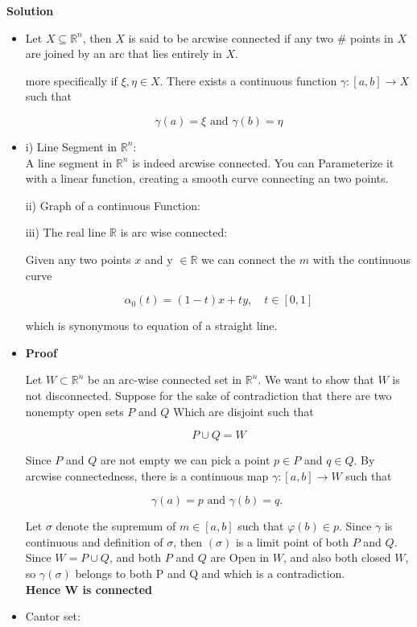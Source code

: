 \documentclass{article}
\begin{document}
\textbf{Solution}\\
\begin{itemize}
    \item Let $X \subseteq \mathbb{R}^{n}$, then $X$ is said to be arcwise connected if any two \# points in $X$ are joined by an arc that lies entirely in $X$.

more specifically if $\xi, \eta \in X$. There exists a continuous function $\gamma:[a, b] \rightarrow X$ such that

$$
\gamma(a)=\xi \text { and } \gamma(b)=\eta
$$
\item i) Line Segment in $\mathbb{R}^{n}$:\\
A line segment in $\mathbb{R}^{n}$ is indeed arcwise connected. You can Parameterize it with a linear function, creating a smooth curve connecting an two points.

ii) Graph of a continuous Function:

iii) The real line $\mathbb{R}$ is arc wise connected:

Given any two points $x$ and y $\in \mathbb{R}$ we can connect the $m$ with the continuous curve

$$
\alpha_{0}(t)=(1-t) x+t y, \quad t \in[0,1]
$$

which is synonymous to equation of a straight line.

\item \textbf{Proof}

Let $W \subset \mathbb{R}^{n}$ be an arc-wise connected set in $\mathbb{R}^{n}$. We want to show that $W$ is not disconnected. Suppose for the sake of contradiction that there are two nonempty open sets $P$ and $Q$ Which are disjoint such that

$$
P \cup Q=W
$$

Since $P$ and $Q$ are not empty we can pick a point $p \in P$ and $q \in Q$. By arcwise connectedness, there is a continuous map $\gamma:[a, b] \rightarrow W$ such that

$$
\gamma(a)=p \text { and } \gamma(b)=q \text {. }
$$

Let $\sigma$ denote the supremum of $m \in[a, b]$ such that $\varphi(b) \in p$. Since $\gamma$ is continuous and definition of $\sigma$, then $(\sigma)$ is a limit point of both $P$ and $Q$. Since $W=P \cup Q$, and both $P$ and $Q$ are Open in $W$, and also both closed $W$, so $\gamma(\sigma)$ belongs to both P and Q and which is a contradiction.\\
\textbf{Hence W is connected}
\item Cantor set:\\


\end{itemize}
\end{document}
